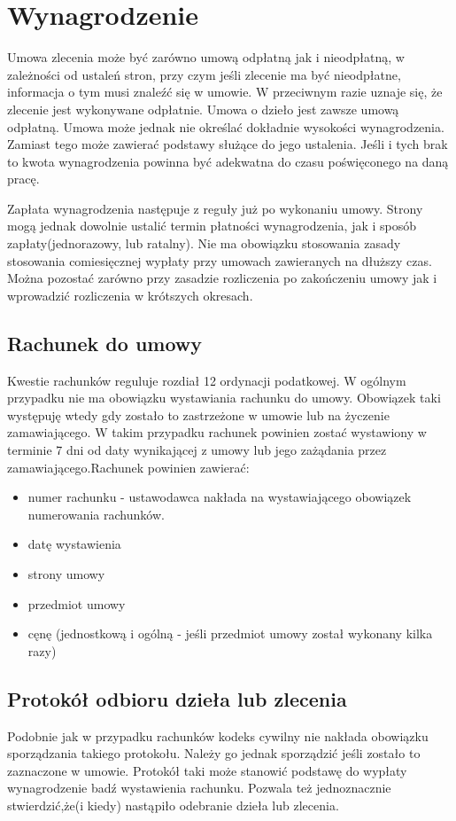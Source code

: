 \section[Wynagrodzenie][Wynagrodzenie]{Wynagrodzenie}
Umowa zlecenia może być zarówno umową odpłatną jak i nieodpłatną, w zależności od ustaleń stron, przy czym jeśli zlecenie ma być nieodpłatne, informacja o tym musi znaleźć się w umowie. W przeciwnym razie uznaje się, że zlecenie jest wykonywane odpłatnie. Umowa o dzieło jest zawsze umową odpłatną. Umowa może jednak nie określać dokładnie wysokości wynagrodzenia. Zamiast tego może zawierać podstawy służące do jego ustalenia. Jeśli i tych brak to kwota wynagrodzenia powinna być adekwatna do czasu poświęconego na daną pracę.

Zapłata wynagrodzenia następuje z reguły już po wykonaniu umowy. Strony mogą jednak dowolnie ustalić termin płatności wynagrodzenia, jak i sposób zapłaty(jednorazowy, lub ratalny). Nie ma obowiązku stosowania zasady stosowania comiesięcznej wypłaty przy umowach zawieranych na dłuższy czas. Można pozostać zarówno przy zasadzie rozliczenia po zakończeniu umowy jak i wprowadzić rozliczenia w krótszych okresach.

\subsection[Rachunek do umowy][Rachunek do umowy]{Rachunek do umowy}
Kwestie rachunków reguluje rozdiał 12 ordynacji podatkowej\cite{TODO}. W ogólnym przypadku nie ma obowiązku wystawiania rachunku do umowy. Obowiązek taki występuję wtedy gdy zostało to zastrzeżone w umowie lub na życzenie zamawiającego. W takim przypadku rachunek powinien zostać wystawiony w terminie 7 dni od daty wynikającej z umowy lub jego zażądania przez zamawiającego.Rachunek powinien zawierać:
\begin{itemize}
\item numer rachunku - ustawodawca nakłada na wystawiającego obowiązek numerowania rachunków.
\item datę wystawienia
\item strony umowy
\item przedmiot umowy
\item cęnę (jednostkową i ogólną - jeśli przedmiot umowy został wykonany kilka razy)
\end{itemize}

\subsection[Protokół odbioru dzieła lub zlecenia][Protokół odbioru dzieła lub zlecenia]{Protokół odbioru dzieła lub zlecenia}
Podobnie jak w przypadku rachunków kodeks cywilny nie nakłada obowiązku sporządzania takiego protokołu. Należy go jednak sporządzić jeśli zostało to zaznaczone w umowie. Protokół taki może stanowić podstawę do wypłaty wynagrodzenie badź wystawienia rachunku. Pozwala też jednoznacznie stwierdzić,że(i kiedy) nastąpiło odebranie dzieła lub zlecenia.

